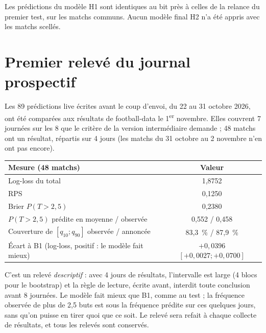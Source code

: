 Les prédictions du modèle H1 sont identiques au bit près à celles de la relance du premier test, sur les
matchs communs. Aucun modèle final H2 n'a été appris avec les matchs scellés.

\section{Premier relevé du journal prospectif}
\label{sec:resultats-prospectif}

Les 89 prédictions live écrites avant le coup d'envoi, du 22 au 31 octobre 2026, ont été comparées aux
résultats de football-data le 1\textsuperscript{er} novembre. Elles couvrent 7 journées sur les 8 que le
critère de la version intermédiaire demande ; 48 matchs ont un résultat, répartis sur 4 jours (les matchs du
31 octobre au 2 novembre n'en ont pas encore).

\begin{center}
\begin{tabular}{lc}
\toprule
Mesure (48 matchs) & Valeur \\
\midrule
Log-loss du total & 1,8752 \\
RPS & 0,1250 \\
Brier \(P(T > 2{,}5)\) & 0,2380 \\
\(P(T > 2{,}5)\) prédite en moyenne / observée & 0,552 / 0,458 \\
Couverture de \([q_{10} ; q_{90}]\) observée / annoncée & 83,3~\% / 87,9~\% \\
Écart à B1 (log-loss, positif : le modèle fait mieux) & \(+0{,}0396\) \([+0{,}0027 ; +0{,}0700]\) \\
\bottomrule
\end{tabular}
\end{center}

C'est un relevé \emph{descriptif} : avec 4 jours de résultats, l'intervalle est large (4 blocs pour le
bootstrap) et la règle de lecture, écrite avant, interdit toute conclusion avant 8 journées. Le modèle fait
mieux que B1, comme au test ; la fréquence observée de plus de 2,5 buts est sous la fréquence prédite sur ces
quelques jours, sans qu'on puisse en tirer quoi que ce soit. Le relevé sera refait à chaque collecte de
résultats, et tous les relevés sont conservés.

